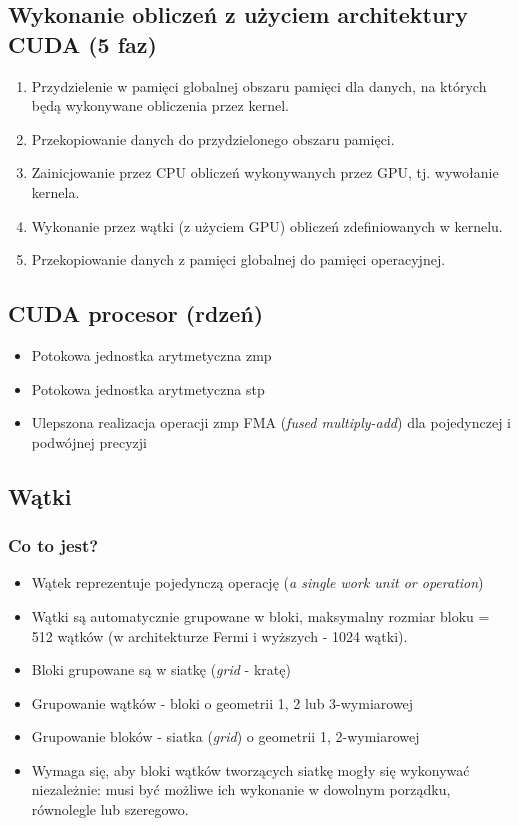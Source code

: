 	\subsection{Wykonanie obliczeń z użyciem architektury CUDA (5 faz)}
		\begin{enumerate}
			\item Przydzielenie w pamięci globalnej obszaru pamięci dla danych, na których będą wykonywane obliczenia przez kernel.
			\item Przekopiowanie danych do przydzielonego obszaru pamięci.
			\item Zainicjowanie przez CPU obliczeń wykonywanych przez GPU, tj. wywołanie kernela.
			\item Wykonanie przez wątki (z użyciem GPU) obliczeń zdefiniowanych w kernelu.
			\item Przekopiowanie danych z pamięci globalnej do pamięci operacyjnej.
		\end{enumerate}
	\subsection{CUDA procesor (rdzeń)}
		\begin{itemize}
			\item Potokowa jednostka arytmetyczna zmp
			\item Potokowa jednostka arytmetyczna stp
			\item Ulepszona realizacja operacji zmp FMA (\emph{fused multiply-add}) dla pojedynczej i podwójnej precyzji
		\end{itemize}

	\subsection{Wątki}
		\subsubsection{Co to jest?}
			\begin{itemize}
				\item Wątek reprezentuje pojedynczą operację (\emph{a single work unit or operation})
				\item Wątki są automatycznie grupowane w bloki, maksymalny rozmiar bloku = 512 wątków (w architekturze Fermi i wyższych - 1024 wątki).
				\item Bloki grupowane są w siatkę (\emph{grid} - kratę)
				\item Grupowanie wątków - bloki o geometrii 1, 2 lub 3-wymiarowej
				\item Grupowanie bloków - siatka (\emph{grid}) o geometrii 1, 2-wymiarowej
				\item Wymaga się, aby bloki wątków tworzących siatkę mogły się wykonywać niezależnie: musi być możliwe ich wykonanie w dowolnym porządku, równolegle lub szeregowo.
			\end{itemize}
